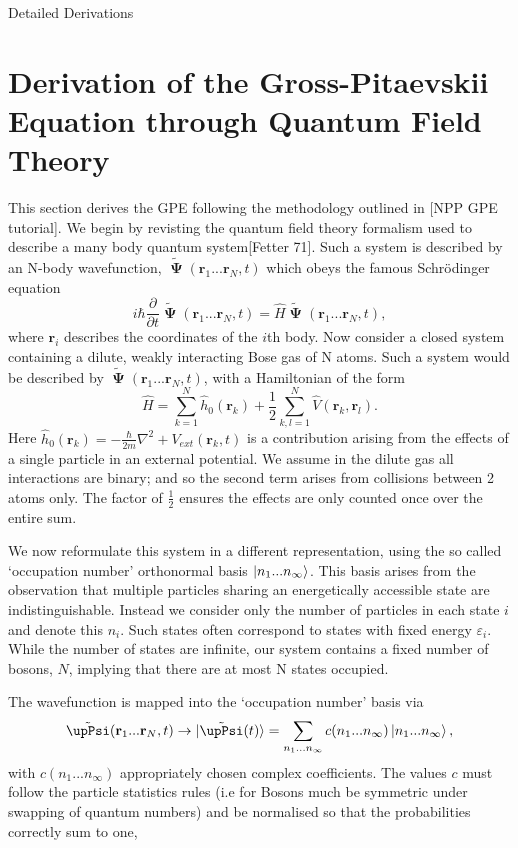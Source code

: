 \begin{chapter}{Detailed Derivations\label{app:App2}}
\section{\label{appsection:gpeqft} Derivation of the Gross-Pitaevskii Equation through Quantum Field Theory}
This section derives the GPE following the methodology outlined in [NPP GPE tutorial]. We begin by revisting the quantum field theory formalism used to describe a many body quantum system[Fetter 71]. Such a system is described by an N-body wavefunction, $\tilde{\bm\upPsi}(\mathbf{r}_1...\mathbf{r}_N,t)$ which obeys the famous Schr\"odinger equation
\begin{equation}
i \hbar\frac{\partial}{\partial t}\tilde{\bm\upPsi}(\mathbf{r}_1...\mathbf{r}_N,t) = \hat{H}\tilde{\bm\upPsi}(\mathbf{r}_1...\mathbf{r}_N,t),
\end{equation}
where $\mathbf{r}_i$ describes the coordinates of the $i$th body. Now consider a closed system containing a dilute, weakly interacting Bose gas of N atoms. Such a system would be described by $\tilde{\bm\upPsi}(\mathbf{r}_1...\mathbf{r}_N,t)$, with a Hamiltonian of the form 
\begin{equation}
\hat{H} = \sum_{k=1}^N\hat{h}_0(\mathbf{r}_k) + \frac{1}{2}\sum_{k,l=1}^N \hat{V}(\mathbf{r}_k,\mathbf{r}_l).
\end{equation}
Here $\hat{h}_0(\mathbf{r}_k) = -\frac{\hbar}{2m}\nabla^2+V_{ext}(\mathbf{r}_k,t)$ is a contribution arising from the effects of a single particle in an external potential. We assume in the dilute gas all interactions are binary; and so the second term arises from collisions between 2 atoms only. The factor of $\frac{1}{2}$ ensures the effects are only counted once over the entire sum.

We now reformulate this system in a different representation, using the so called `occupation number' orthonormal basis $\ket{n_1...n_\infty}$. This basis arises from the observation that multiple particles sharing an energetically accessible state are indistinguishable. Instead we consider only the number of particles in each state $i$ and denote this $n_i$. Such states often correspond to states with fixed energy $\varepsilon_i$. While the number of states are infinite, our system contains a fixed number of bosons, $N$, implying that there are at most N states occupied.

The wavefunction is mapped into the `occupation number' basis via
\begin{equation}
\tilde{\bm\upPsi}(\mathbf{r}_1...\mathbf{r}_N,t) \rightarrow \ket{\tilde{\bm\upPsi}(t)}=\sum_{n_1...n_\infty} c(n_1...n_\infty)\ket{n_1...n_\infty},
\end{equation}
with $c(n_1...n_\infty)$ appropriately chosen complex coefficients. The values $c$ must follow the particle statistics rules (i.e for Bosons much be symmetric under swapping of quantum numbers) and be normalised so that the probabilities correctly sum to one,


\end{chapter}
